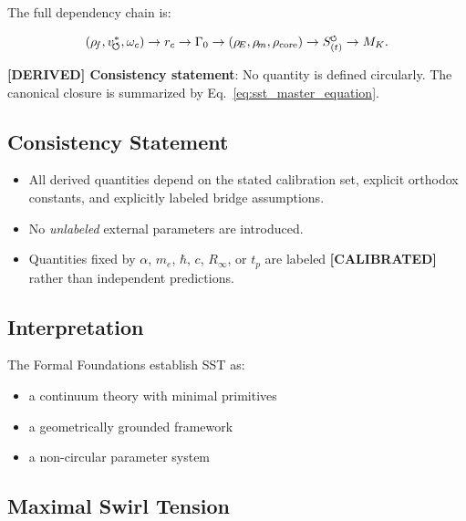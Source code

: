 \documentclass[11pt]{article}
\theoremstyle{definition}
\theoremstyle{plain}
\theoremstyle{remark}
\newcommand{\swirlarrow}{\mathchoice{\mkern-2mu\scriptstyle\boldsymbol{\circlearrowleft}}{\mkern-2mu\scriptstyle\boldsymbol{\circlearrowleft}}{\mkern-2mu\scriptscriptstyle\boldsymbol{\circlearrowleft}}{\mkern-2mu\scriptscriptstyle\boldsymbol{\circlearrowleft}}}
\newcommand{\rhoF}{{\rho_{\!f}}}
\newcommand{\rhoE}{\rho_{\!E}}
\newcommand{\rhoM}{\rho_{\!m}}
\newcommand{\rhocore}{\rho_{\mathrm{core}}}
\newcommand{\SwirlClock}{{S_{(t)}^{\swirlarrow}}}
\newcommand{\rc}{{r_c}}
\newcommand{\vchar}{v_{\!\boldsymbol{\circlearrowleft}}^{\ast}}
\begin{document}
        The full dependency chain is:
        
        \begin{align}
        (\rhoF, \vchar, \omega_c)
            \rightarrow \rc
            \rightarrow \Gamma_0
            \rightarrow (\rhoE, \rhoM, \rhocore)
            \rightarrow \SwirlClock
            \rightarrow M_K.
        \end{align}
        
        \textbf{[DERIVED] Consistency statement}:
        No quantity is defined circularly. The canonical closure is summarized by Eq.~\ref{eq:sst_master_equation}.
    
    \subsection{Consistency Statement}
        
        \begin{itemize}
            \item All derived quantities depend on the stated calibration set, explicit orthodox constants, and explicitly labeled bridge assumptions.
            \item No \emph{unlabeled} external parameters are introduced.
            \item Quantities fixed by $\alpha$, $m_e$, $\hbar$, $c$, $R_\infty$, or $t_p$ are labeled \textbf{[CALIBRATED]} rather than independent predictions.
        \end{itemize}
    
    \subsection{Interpretation}
        
        The Formal Foundations establish SST as:
        
        \begin{itemize}
            \item a continuum theory with minimal primitives
            \item a geometrically grounded framework
            \item a non-circular parameter system
        \end{itemize}

    \subsection{Maximal Swirl Tension}
    \label{sec:Fmax}
\end{document}
